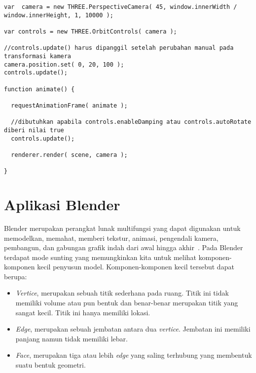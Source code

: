 \begin{itemize}
\begin{lstlisting}[caption={Contoh penggunaan kelas {\it OrbitControls}.}, label={lst:orbit},captionpos=b]
var  camera = new THREE.PerspectiveCamera( 45, window.innerWidth / window.innerHeight, 1, 10000 );

var controls = new THREE.OrbitControls( camera );

//controls.update() harus dipanggil setelah perubahan manual pada transformasi kamera
camera.position.set( 0, 20, 100 );
controls.update();

function animate() {

  requestAnimationFrame( animate );

  //dibutuhkan apabila controls.enableDamping atau controls.autoRotate diberi nilai true
  controls.update();

  renderer.render( scene, camera );

}
\end{lstlisting}

\end{itemize}


\section{Aplikasi Blender}
\label{sec:blender}
Blender merupakan perangkat lunak multifungsi yang dapat digunakan untuk memodelkan, memahat, memberi tekstur, animasi, pengendali kamera, pembangun, dan gabungan grafik indah dari awal hingga akhir~\cite{blender}. Pada Blender terdapat mode sunting yang memungkinkan kita untuk melihat komponen-komponen kecil penyusun model. Komponen-komponen kecil tersebut dapat berupa:
\begin{itemize}
	\item {\it Vertice}, merupakan sebuah titik sederhana pada ruang. Titik ini tidak memiliki volume atau pun bentuk dan benar-benar merupakan titik yang sangat kecil. Titik ini hanya memiliki lokasi.
	\item {\it Edge}, merupakan sebuah jembatan antara dua {\it vertice}. Jembatan ini memiliki panjang namun tidak memiliki lebar.
	\item {\it Face}, merupakan tiga atau lebih {\it edge} yang saling terhubung yang membentuk suatu bentuk geometri. 
\end{itemize}

